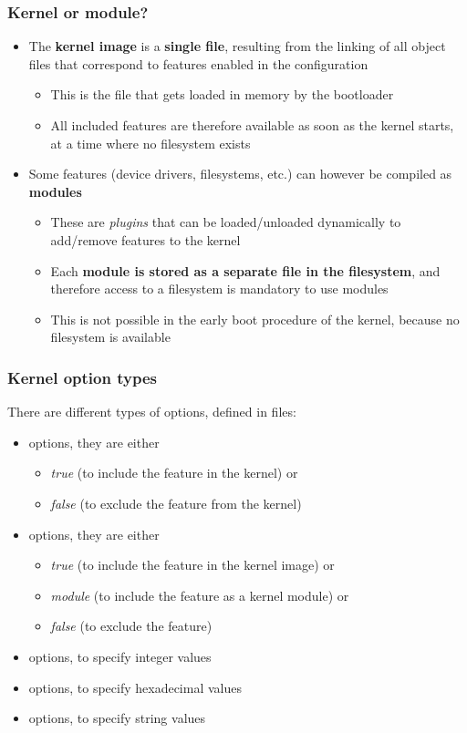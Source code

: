 \begin{frame}
  \frametitle{Kernel or module?}
  \begin{itemize}
  \item The {\bf kernel image} is a {\bf single file}, resulting from
    the linking of all object files that correspond to features
    enabled in the configuration
    \begin{itemize}
    \item This is the file that gets loaded in memory by the
      bootloader
    \item All included features are therefore available as soon as the
      kernel starts, at a time where no filesystem exists
    \end{itemize}
  \item Some features (device drivers, filesystems, etc.) can however
    be compiled as {\bf modules}
    \begin{itemize}
    \item These are {\em plugins} that can be loaded/unloaded dynamically to
      add/remove features to the kernel
    \item Each {\bf module is stored as a separate file in the
        filesystem}, and therefore access to a filesystem is mandatory
      to use modules
    \item This is not possible in the early boot procedure of the
      kernel, because no filesystem is available
    \end{itemize}
  \end{itemize}
\end{frame}

\begin{frame}
  \frametitle{Kernel option types}
  There are different types of options, defined in  files:
  \begin{itemize}
  \item {} options, they are either
    \begin{itemize}
    \item {\em true} (to include the feature in the kernel) or
    \item {\em false} (to exclude the feature from the kernel)
    \end{itemize}
  \item {} options, they are either
    \begin{itemize}
    \item {\em true} (to include the feature in the kernel image) or
    \item {\em module} (to include the feature as a kernel module) or
    \item {\em false} (to exclude the feature)
    \end{itemize}
  \item {} options, to specify integer values
  \item {} options, to specify hexadecimal values
  \item {} options, to specify string values
  \end{itemize}
\end{frame}

